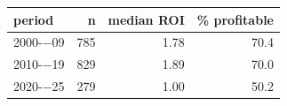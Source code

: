 \begin{tabular}{lrrr}
\toprule
period & n & median ROI & \% profitable \\
\midrule
2000-$-$09 & 785 & 1.78 & 70.4 \\
2010-$-$19 & 829 & 1.89 & 70.0 \\
2020-$-$25 & 279 & 1.00 & 50.2 \\
\bottomrule
\end{tabular}
